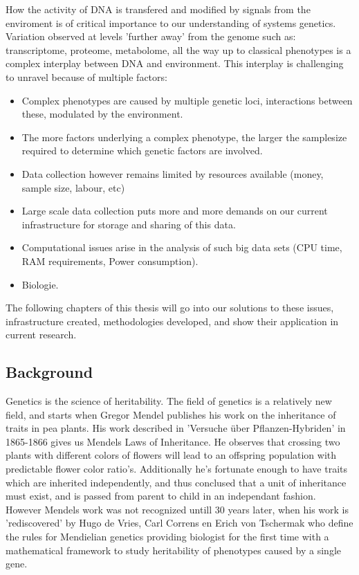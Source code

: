 How the activity of DNA is transfered and modified by signals from the enviroment is of 
critical importance to our understanding of systems genetics. Variation observed at levels 
'further away' from the genome such as: transcriptome, proteome, metabolome, all the way 
up to classical phenotypes is a complex interplay between DNA and environment. This 
interplay is challenging to unravel because of multiple factors:\\
\begin{itemize}
\item Complex phenotypes are caused by multiple genetic loci, interactions between these, 
modulated by the environment.
\item The more factors underlying a complex phenotype, the larger the samplesize required 
to determine which genetic factors are involved.
\item Data collection however remains limited by resources available (money, sample size, labour, etc)
\item Large scale data collection puts more and more demands on our current infrastructure for 
storage and sharing of this data.
\item Computational issues arise in the analysis of such big data sets (CPU time, RAM requirements, 
Power consumption).
\item Biologie.
\end{itemize}

The following chapters of this thesis will go into our solutions to these issues, infrastructure 
created, methodologies developed, and show their application in current research.

\subsection{Background}

Genetics is the science of heritability. The field of genetics is a relatively new field, 
and starts when Gregor Mendel publishes his work on the inheritance of traits in pea plants. 
His work described in 'Versuche \"uber Pflanzen-Hybriden' in 1865-1866 \cite{Mendel:1866} 
gives us Mendels Laws of Inheritance. He observes that crossing two plants with different 
colors of flowers will lead to an offspring population with predictable flower color 
ratio's. Additionally he's fortunate enough to have traits which are inherited independently, 
and thus conclused that a unit of inheritance must exist, and is passed from parent to 
child in an independant fashion. However Mendels work was not recognized untill 30 years later, 
when his work is 'rediscovered' by Hugo de Vries, Carl Correns en Erich von Tschermak who 
define the rules for Mendielian genetics \cite{deVries:1889} providing biologist for the first 
time with a mathematical framework to study heritability of phenotypes caused by a single gene.

